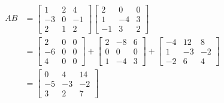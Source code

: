 \documentclass{article}
\begin{document}
\subsubsection{}
\begin{align*}
    AB & =
    \begin{bmatrix}
        1  & 2 & 4  \\
        -3 & 0 & -1 \\
        2  & 1 & 2
    \end{bmatrix}
    \begin{bmatrix}
        2  & 0  & 0 \\
        1  & -4 & 3 \\
        -1 & 3  & 2
    \end{bmatrix}  \\
       & =
    \begin{bmatrix}
        2  & 0 & 0 \\
        -6 & 0 & 0 \\
        4  & 0 & 0
    \end{bmatrix} +
    \begin{bmatrix}
        2 & -8 & 6 \\
        0 & 0  & 0 \\
        1 & -4 & 3
    \end{bmatrix} +
    \begin{bmatrix}
        -4 & 12 & 8  \\
        1  & -3 & -2 \\
        -2 & 6  & 4
    \end{bmatrix} \\
       & =
    \begin{bmatrix}
        0  & 4  & 14 \\
        -5 & -3 & -2 \\
        3  & 2  & 7
    \end{bmatrix} \\
\end{align*}
\end{document}
